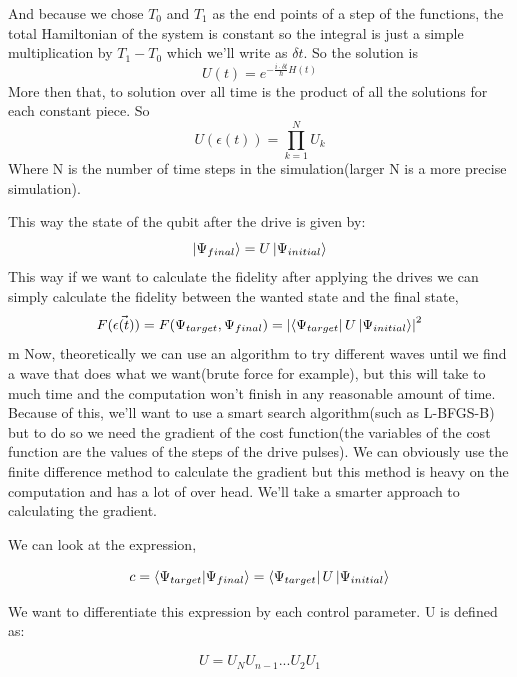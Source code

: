 \documentclass{article}
\numberwithin{equation}{section} %
\begin{document}
And because we chose $T_0$ and $T_1$ as the end points of a step of the functions, the total Hamiltonian of the system is constant so the integral is just a simple multiplication by $T_1-T_0$ which we'll write as $\delta t$. So the solution is
\begin{equation}
U(t) = e^{-\frac{i\cdot \delta t}{\hbar}H(t)}
\end{equation}
More then that, to solution over all time is the product of all the solutions for each constant piece. So 
\begin{equation}
U(\epsilon(t)) = \prod_{k = 1}^NU_k
\end{equation}
Where N is the number of time steps in the simulation(larger N is a more precise simulation). \par
This way the state of the qubit after the drive is given by:
\begin{equation}
\ket{\Psi_{final}} = U\ket{\Psi_{initial}}
\end{equation}
This way if we want to calculate the fidelity after applying the drives we can simply calculate the fidelity between the wanted state and the final state,
\begin{equation}
F(\Vec{\epsilon(t)}) = F(\Psi_{target}, \Psi_{final}) = \abs{\bra{\Psi_{target}}U\ket{\Psi_{initial}}}^2
\end{equation}
m
Now, theoretically we can use an algorithm to try different waves until we find a wave that does what we want(brute force for example), but this will take to much time and the computation won't finish in any reasonable amount of time. Because of this, we'll want to use a smart search algorithm(such as L-BFGS-B) but to do so we need the gradient of the cost function(the variables of the cost function are the values of the steps of the drive pulses). We can obviously use the finite difference method to calculate the gradient but this method is heavy on the computation and has a lot of over head. We'll take a smarter approach to calculating the gradient.\par
We can look at the expression,  %

\begin{equation}
c = \braket{\Psi_{target}}{\Psi_{final}} = \bra{\Psi_{target}}U\ket{\Psi_{initial}}
\end{equation}

We want to differentiate this expression by each control parameter. U is defined as:

$$U = U_N U_{n-1}...U_2 U_1$$
\end{document}
